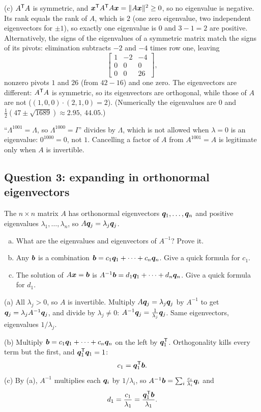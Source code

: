 \begin{solution}
(c) $A^{\mathsf{T}} A$ is symmetric, and $\boldsymbol{x}^{\mathsf{T}} A^{\mathsf{T}} A\boldsymbol{x}=\|A\boldsymbol{x}\|^{2}\ge0$, so no eigenvalue is negative. Its rank equals the rank of $A$, which is $2$ (one zero eigenvalue, two independent eigenvectors for $\pm1$), so exactly one eigenvalue is $0$ and $3-1=2$ are positive. Alternatively, the signs of the eigenvalues of a symmetric matrix match the signs of its pivots: elimination subtracts $-2$ and $-4$ times row one, leaving
\[
\begin{bmatrix}1&-2&-4\\0&0&0\\0&0&26\end{bmatrix},
\]
nonzero pivots $1$ and $26$ (from $42-16$) and one zero. The eigenvectors are different: $A^{\mathsf{T}} A$ is symmetric, so its eigenvectors are orthogonal, while those of $A$ are not ($(1,0,0)\cdot(2,1,0)=2$). (Numerically the eigenvalues are $0$ and $\tfrac12(47\pm\sqrt{1689})\approx2.95,\ 44.05$.)
\end{solution}

\begin{trap}
``$\Lambda^{1001}=\Lambda$, so $\Lambda^{1000}=I$'' divides by $\Lambda$, which is not allowed when $\lambda=0$ is an eigenvalue: $0^{1000}=0$, not $1$. Cancelling a factor of $A$ from $A^{1001}=A$ is legitimate only when $A$ is invertible.
\end{trap}

\subsection{Question 3: expanding in orthonormal eigenvectors}

\begin{exercise}\label{exr:u38-q3}
The $n\times n$ matrix $A$ has orthonormal eigenvectors $\boldsymbol{q}_1,\dots,\boldsymbol{q}_n$ and positive eigenvalues $\lambda_1,\dots,\lambda_n$, so $A\boldsymbol{q}_j=\lambda_j\boldsymbol{q}_j$.
\begin{enumerate}[(a)]
\item What are the eigenvalues and eigenvectors of $A^{-1}$? Prove it.
\item Any $\boldsymbol{b}$ is a combination $\boldsymbol{b}=c_1\boldsymbol{q}_1+\dots+c_n\boldsymbol{q}_n$. Give a quick formula for $c_1$.
\item The solution of $A\boldsymbol{x}=\boldsymbol{b}$ is $A^{-1}\boldsymbol{b}=d_1\boldsymbol{q}_1+\dots+d_n\boldsymbol{q}_n$. Give a quick formula for $d_1$.
\end{enumerate}
\end{exercise}
\begin{solution}
(a) All $\lambda_j>0$, so $A$ is invertible. Multiply $A\boldsymbol{q}_j=\lambda_j\boldsymbol{q}_j$ by $A^{-1}$ to get $\boldsymbol{q}_j=\lambda_jA^{-1}\boldsymbol{q}_j$, and divide by $\lambda_j\neq0$: $A^{-1}\boldsymbol{q}_j=\frac{1}{\lambda_j}\boldsymbol{q}_j$. Same eigenvectors, eigenvalues $1/\lambda_j$.

(b) Multiply $\boldsymbol{b}=c_1\boldsymbol{q}_1+\dots+c_n\boldsymbol{q}_n$ on the left by $\boldsymbol{q}_1^{\mathsf{T}}$. Orthogonality kills every term but the first, and $\boldsymbol{q}_1^{\mathsf{T}}\boldsymbol{q}_1=1$:
\[
c_1=\boldsymbol{q}_1^{\mathsf{T}}\boldsymbol{b}.
\]
(c) By (a), $A^{-1}$ multiplies each $\boldsymbol{q}_i$ by $1/\lambda_i$, so $A^{-1}\boldsymbol{b}=\sum_i\frac{c_i}{\lambda_i}\boldsymbol{q}_i$ and
\[
d_1=\frac{c_1}{\lambda_1}=\frac{\boldsymbol{q}_1^{\mathsf{T}}\boldsymbol{b}}{\lambda_1}.
\]
\end{solution}

